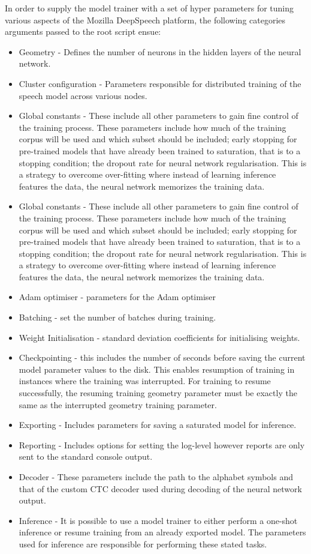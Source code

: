 In order to supply the model trainer with a set of hyper parameters for tuning various aspects of the Mozilla DeepSpeech platform, the following categories arguments passed to the root script ensue:
\begin{itemize}
    \item Geometry - Defines the number of neurons in the hidden layers of the neural network.
    \item Cluster configuration - Parameters responsible for distributed training of the speech model across various nodes.
    \item Global constants - These include all other parameters to gain fine control of the training process.  These parameters include how much of the training corpus will be used and which subset should be included; early stopping for pre-trained models that have already been trained to saturation, that is to a stopping condition; the dropout rate for neural network regularisation.  This is a strategy to overcome over-fitting where instead of learning inference features the data, the neural network memorizes the training data.
    \item Global constants - These include all other parameters to gain fine control of the training process.  These parameters include how much of the training corpus will be used and which subset should be included; early stopping for pre-trained models that have already been trained to saturation, that is to a stopping condition; the dropout rate for neural network regularisation.  This is a strategy to overcome over-fitting where instead of learning inference features the data, the neural network memorizes the training data.
    \item Adam optimiser - parameters for the Adam optimiser
    \item Batching - set the number of batches during training.
    \item Weight Initialisation - standard deviation coefficients for initialising weights.
    \item Checkpointing - this includes the number of seconds before saving the current model parameter values to the disk.  This enables resumption of training in instances where the training was interrupted. For training to resume successfully, the resuming training geometry parameter must be exactly the same as the interrupted geometry training parameter.
    \item Exporting - Includes parameters for saving a saturated model for inference.
    \item Reporting - Includes options for setting the log-level however reports are only sent to the standard console output.
    \item Decoder - These parameters include the path to the alphabet symbols and that of the custom CTC decoder used during decoding of the neural network output.
    \item Inference - It is possible to use a model trainer to either perform a one-shot inference or resume training from an already exported model. The parameters used for inference are responsible for performing these stated tasks.
\end{itemize}

